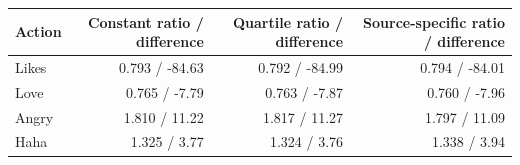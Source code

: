 \begin{tabular}{lrrr}
\toprule
Action & Constant ratio / difference & Quartile ratio / difference & Source-specific ratio / difference \\
\midrule
Likes & 0.793 / -84.63 & 0.792 / -84.99 & 0.794 / -84.01 \\
Love & 0.765 / -7.79 & 0.763 / -7.87 & 0.760 / -7.96 \\
Angry & 1.810 / 11.22 & 1.817 / 11.27 & 1.797 / 11.09 \\
Haha & 1.325 / 3.77 & 1.324 / 3.76 & 1.338 / 3.94 \\
\bottomrule
\end{tabular}

